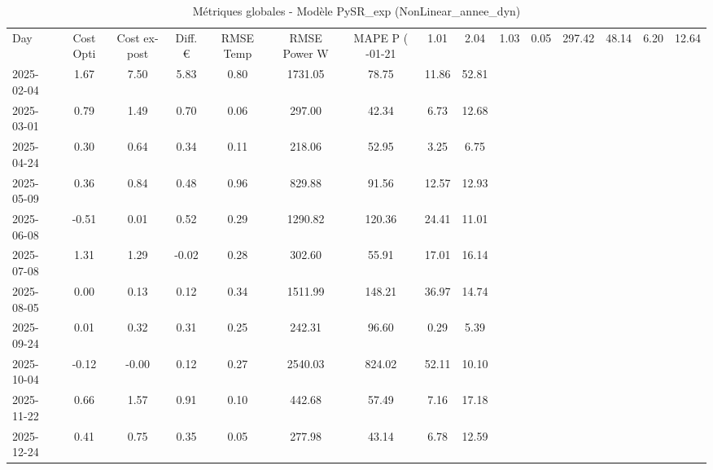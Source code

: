 \begin{table}
\caption{Métriques globales - Modèle PySR_exp (NonLinear_annee_dyn)}
\label{tab:PySR_exp_NonLinear_annee_dyn_Validation_EPlus_VS_Opti}
\begin{small}
\begin{tabular}{lcccccccc}
\toprule
Day & Cost Opti & Cost ex-post & Diff. € & RMSE Temp & RMSE Power W & MAPE P (%
-01-21 & 1.01 & 2.04 & 1.03 & 0.05 & 297.42 & 48.14 & 6.20 & 12.64 \\
2025-02-04 & 1.67 & 7.50 & 5.83 & 0.80 & 1731.05 & 78.75 & 11.86 & 52.81 \\
2025-03-01 & 0.79 & 1.49 & 0.70 & 0.06 & 297.00 & 42.34 & 6.73 & 12.68 \\
2025-04-24 & 0.30 & 0.64 & 0.34 & 0.11 & 218.06 & 52.95 & 3.25 & 6.75 \\
2025-05-09 & 0.36 & 0.84 & 0.48 & 0.96 & 829.88 & 91.56 & 12.57 & 12.93 \\
2025-06-08 & -0.51 & 0.01 & 0.52 & 0.29 & 1290.82 & 120.36 & 24.41 & 11.01 \\
2025-07-08 & 1.31 & 1.29 & -0.02 & 0.28 & 302.60 & 55.91 & 17.01 & 16.14 \\
2025-08-05 & 0.00 & 0.13 & 0.12 & 0.34 & 1511.99 & 148.21 & 36.97 & 14.74 \\
2025-09-24 & 0.01 & 0.32 & 0.31 & 0.25 & 242.31 & 96.60 & 0.29 & 5.39 \\
2025-10-04 & -0.12 & -0.00 & 0.12 & 0.27 & 2540.03 & 824.02 & 52.11 & 10.10 \\
2025-11-22 & 0.66 & 1.57 & 0.91 & 0.10 & 442.68 & 57.49 & 7.16 & 17.18 \\
2025-12-24 & 0.41 & 0.75 & 0.35 & 0.05 & 277.98 & 43.14 & 6.78 & 12.59 \\
\bottomrule
\end{tabular}
\end{small}
\end{table}

